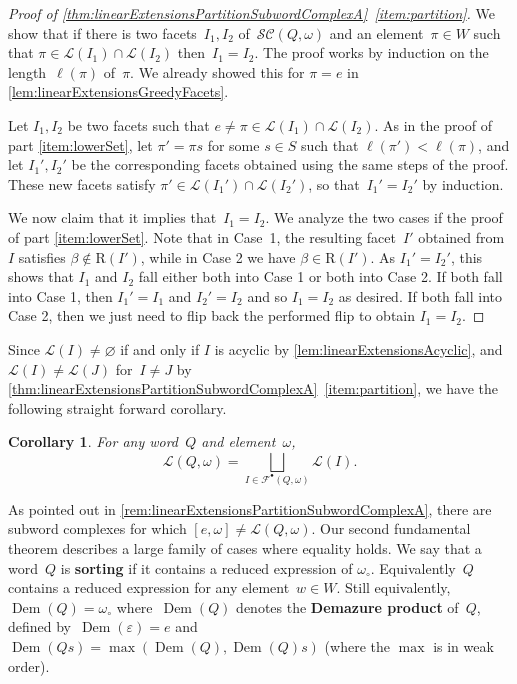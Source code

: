 \documentclass[reqno]{amsart}
\newtheorem{corollary}[theorem]{Corollary}
\theoremstyle{definition}
\DeclareMathOperator{\DemazureProduct}{Dem} %
\newcommand{\defn}[1]{\textbf{\textsf{\color{PineGreen} #1}}} %
\newcommand{\linearExtensions}{\mathcal{L}} %
\newcommand{\wo}{\omega_\circ} %
\newcommand{\subwordComplex}{\mathcal{SC}} %
\newcommand{\Roots}{\mathrm{R}} %
\newcommand{\subwordAcyclicFacets}{\mathcal{F}^\bullet} %
\begin{document}
\begin{proof}[Proof of \cref{thm:linearExtensionsPartitionSubwordComplexA}~\eqref{item:partition}]
We show that if there is two facets~$I_1, I_2$ of~$\subwordComplex(Q, \omega)$ and an element~$\pi \in W$ such that $\pi \in \linearExtensions(I_1) \cap \linearExtensions(I_2)$ then~$I_1= I_2$.
The proof works by induction on the length~$\ell(\pi)$ of~$\pi$.
We already showed this for $\pi = e$ in \cref{lem:linearExtensionsGreedyFacets}.

Let $I_1, I_2$ be two facets such that $e \neq \pi \in \linearExtensions(I_1)\cap \linearExtensions(I_2)$.
As in the proof of part \eqref{item:lowerSet}, let $\pi'=\pi s$ for some $s\in S$ such that $\ell(\pi')<\ell(\pi)$, and let $I_1',I_2'$ be the corresponding facets obtained using the same steps of the proof.
These new facets satisfy $\pi' \in \linearExtensions(I_1')\cap \linearExtensions(I_2')$, so that~$I_1' = I_2'$ by induction.

We now claim that it implies that~$I_1 = I_2$.
We analyze the two cases if the proof of part \eqref{item:lowerSet}.
Note that in Case~1, the resulting facet~$I'$ obtained from $I$ satisfies $\beta\notin \Roots(I')$, while in Case 2 we have $\beta \in \Roots(I')$. 
As $I_1' = I_2'$, this shows that $I_1$ and $I_2$ fall either both into Case 1 or both into Case 2.
If both fall into Case 1, then $I_1'=I_1$ and $I_2'=I_2$ and so $I_1=I_2$ as desired.
If both fall into Case 2, then we just need to flip back the performed flip to obtain $I_1=I_2$.
\end{proof}

Since $\linearExtensions(I)\neq \varnothing$ if and only if $I$ is acyclic by \cref{lem:linearExtensionsAcyclic}, and~$\linearExtensions(I) \ne \linearExtensions(J)$ for~$I \ne J$ by \cref{thm:linearExtensionsPartitionSubwordComplexA}~\eqref{item:partition}, we have the following straight forward corollary.

\begin{corollary}
\label{coro:linearExtensionsPartitionSubwordComplexes}
For any word~$Q$ and element~$\omega$,
\[
\linearExtensions(Q,\omega) = \bigsqcup_{I\in\subwordAcyclicFacets(Q,\omega)} \linearExtensions(I).
\]
\end{corollary}

As pointed out in \cref{rem:linearExtensionsPartitionSubwordComplexA}, there are subword complexes for which $[e,\omega] \neq \linearExtensions(Q,\omega)$.
Our second fundamental theorem describes a large family of cases where equality holds.
We say that a word~$Q$ is \defn{sorting} if it contains a reduced expression of $\wo$.
Equivalently~$Q$ contains a reduced expression for any element~$w \in W$.
Still equivalently, $\DemazureProduct(Q) = \wo$ where~$\DemazureProduct(Q)$ denotes the \defn{Demazure product} of~$Q$, defined by~$\DemazureProduct(\varepsilon) = e$ and~$\DemazureProduct(Qs) = \max(\DemazureProduct(Q), \DemazureProduct(Q)s)$ (where the $\max$ is in weak order).
\end{document}
